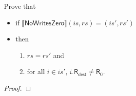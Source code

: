 \documentclass[12pt, letterpaper]{article}
\newcommand\interp[1]{\llbracket #1 \rrbracket}
\begin{document}
 Prove that
 \begin{itemize}
 \item  if
   $\interp{ \mathsf{NoWritesZero} } (\mathit{is}, \mathit{rs}) =
   (\mathit{is}', \mathit{rs}')$
 \item then
   \begin{enumerate}
   \item $\mathit{rs} = \mathit{rs'}$ and
   \item for all $i \in \mathit{is}'$, $i.\mathsf{R}_{\mathsf{dest}} \neq \mathsf{R}_0$.
   \end{enumerate}
 \end{itemize}
 \begin{proof}
 

\end{proof}
\end{document}
